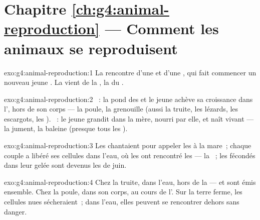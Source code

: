 \section*{Chapitre \ref{ch:g4:animal-reproduction} --- Comment les animaux se reproduisent}

\begin{solution}{exo:g4:animal-reproduction:1}
La rencontre d'une  et d'une , qui fait
commencer un nouveau jeune . La  vient de la
, la  du .
\end{solution}

\begin{solution}{exo:g4:animal-reproduction:2}
~: la  pond des  et le jeune achève sa croissance
dans l', hors de son corps --- la poule, la grenouille (aussi la
truite, les lézards, les escargots, les ). ~: le
jeune grandit dans la mère, nourri par elle, et naît vivant --- la
jument, la baleine (presque tous les ).
\end{solution}

\begin{solution}{exo:g4:animal-reproduction:3}
Les  chantaient pour appeler les  à la mare~; chaque
couple a libéré ses cellules dans l'eau, où les  ont
rencontré les  --- la ~; les  fécondés dans leur
gelée sont devenus les  de juin.
\end{solution}

\begin{solution}{exo:g4:animal-reproduction:4}
Chez la truite, dans l'eau, hors de la  ---  et  sont émis ensemble. Chez la poule, dans son corps, au cours de
l'. Sur la terre ferme, les cellules nues sécheraient~;
dans l'eau, elles peuvent se rencontrer dehors sans danger.
\end{solution}

